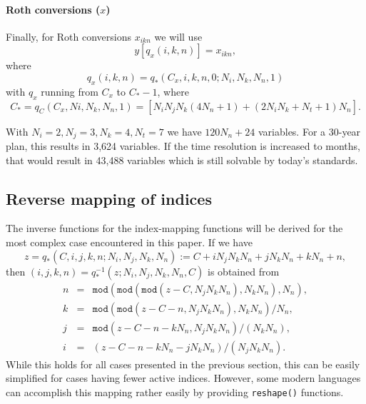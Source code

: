 \documentclass{report}[fleqn,12pt]
\begin{document}
\paragraph*{Roth conversions (\boldmath$x$)}
Finally, for Roth conversions $x_{ikn}$ we will use
\begin{equation}
	y[q_x(i, k, n)] = x_{i k n},
\end{equation}
where
\begin{equation}
	q_x(i, k, n) = q_*(C_x, i, k, n, 0; N_i, N_k, N_n, 1)
\end{equation}
with $q_x$ running from $C_x$ to $C_* - 1$, where
\[
	C_* = q_C(C_x, Ni, N_k, N_n, 1) = [N_iN_jN_k(4N_n + 1) + (2N_iN_k + N_t + 1) N_n].
\]

With $N_i = 2, N_j = 3, N_k = 4, N_t = 7$ we have $120N_n + 24$ variables. For
a 30-year plan, this results in 3,624 variables. If the time resolution is increased to
months, that would result in 43,488 variables which is still solvable by today's standards.

\subsection{Reverse mapping of indices}
The inverse functions for the index-mapping functions will be derived for the
most complex case encountered in this paper.
If we have
\begin{equation}
	z = q_*(C, i, j, k, n; N_i, N_j, N_k, N_n) := C + iN_jN_kN_n + jN_kN_n + kN_n + n,
\end{equation}
then $(i, j, k, n) = q_*^{-1}(z; N_i, N_j, N_k, N_n, C)$ is obtained from
\begin{eqnarray}
	n &=& \texttt{mod}(\texttt{mod}(\texttt{mod}(z - C, N_jN_kN_n), N_kN_n), N_n), \nonumber \\
	k &=& \texttt{mod}(\texttt{mod}(z - C - n, N_jN_kN_n), N_kN_n)/N_n, \nonumber \\
	j &=& \texttt{mod}(z - C - n - kN_n, N_jN_kN_n)/(N_kN_n), \nonumber \\
	i &=& (z - C - n - kN_n - jN_kN_n)/(N_jN_kN_n).
\end{eqnarray}
While this holds for all cases presented in the previous section, this can be easily simplified
for cases having fewer active indices. However, some modern languages can accomplish this
mapping rather easily by providing \texttt{reshape()} functions.
\end{document}
